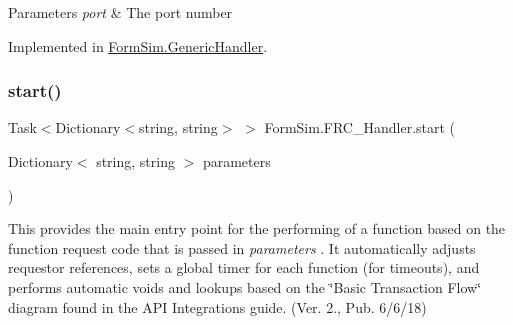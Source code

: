 \begin{DoxyParams}{Parameters}
{\em port} & The port number\\
\hline
\end{DoxyParams}


Implemented in \mbox{\hyperlink{class_form_sim_1_1_generic_handler_ad22f25ee6f474e2ac46361add5ca7f97}{Form\+Sim.\+Generic\+Handler}}.

\mbox{\label{interface_form_sim_1_1_f_r_c___handler_a2a2a8a776e774e5f8b5e2b7e623a26a6}} 
\subsubsection{\texorpdfstring{start()}{start()}}
{\footnotesize\ttfamily Task$<$Dictionary$<$string, string$>$ $>$ Form\+Sim.\+F\+R\+C\+\_\+\+Handler.\+start (\begin{DoxyParamCaption}\item[{Dictionary$<$ string, string $>$}]{parameters }\end{DoxyParamCaption})}



This provides the main entry point for the performing of a function based on the function request code that is passed in {\itshape parameters} . It automatically adjusts requestor references, sets a global timer for each function (for timeouts), and performs automatic voids and lookups based on the \char`\"{}\+Basic Transaction Flow\char`\"{} diagram found in the A\+PI Integrations guide. (Ver. 2., Pub. 6/6/18) 


